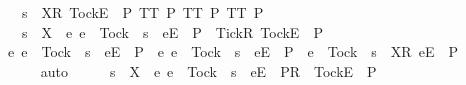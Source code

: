 \begin{isabellebody}
\ \ \ {\isachardoublequoteopen}s\ {\isacharat}\ {\isacharbrackleft}{\isacharbrackleft}X{\isacharbrackright}\isactrlsub R{\isacharcomma}\ {\isacharbrackleft}Tock{\isacharbrackright}\isactrlsub E{\isacharbrackright}\ {\isasymin}\ P{\isachardoublequoteclose}\ {\isachardoublequoteopen}TT{}\ P{\isachardoublequoteclose}\ {\isachardoublequoteopen}TT{}\ P{\isachardoublequoteclose}\ {\isachardoublequoteopen}TT{}\ P{\isachardoublequoteclose}\isanewline
\ \ \ {\isachardoublequoteopen}s\ {\isacharat}\ {\isacharbrackleft}{\isacharbrackleft}X\ {\isasymunion}\ {\isacharbraceleft}e{\isachardot}\ e\ {\isasymnoteq}\ Tock\ {\isasymand}\ s\ {\isacharat}\ {\isacharbrackleft}{\isacharbrackleft}e{\isacharbrackright}\isactrlsub E{\isacharbrackright}\ {\isasymnotin}\ P{\isacharbraceright}\ {\isasymunion}\ {\isacharbraceleft}Tick{\isacharbraceright}{\isacharbrackright}\isactrlsub R{\isacharcomma}\ {\isacharbrackleft}Tock{\isacharbrackright}\isactrlsub E{\isacharbrackright}\ {\isasymin}\ P{\isachardoublequoteclose}\isanewline
%
\isadelimproof
%
\endisadelimproof
%
\isatagproof
{}\isamarkupfalse%
\ {\isacharminus}\isanewline
\ \ \isamarkupfalse%
\ {\isachardoublequoteopen}{\isacharbraceleft}e{\isachardot}\ e\ {\isasymnoteq}\ Tock\ {\isasymand}\ s\ {\isacharat}\ {\isacharbrackleft}{\isacharbrackleft}e{\isacharbrackright}\isactrlsub E{\isacharbrackright}\ {\isasymnotin}\ P{\isacharbraceright}\ {\isasyminter}\ {\isacharbraceleft}e{\isachardot}\ {\isacharparenleft}e\ {\isasymnoteq}\ Tock\ {\isasymand}\ s\ {\isacharat}\ {\isacharbrackleft}{\isacharbrackleft}e{\isacharbrackright}\isactrlsub E{\isacharbrackright}\ {\isasymin}\ P{\isacharparenright}\ {\isasymor}\ {\isacharparenleft}e\ {\isacharequal}\ Tock\ {\isasymand}\ s\ {\isacharat}\ {\isacharbrackleft}{\isacharbrackleft}X{\isacharbrackright}\isactrlsub R{\isacharcomma}\ {\isacharbrackleft}e{\isacharbrackright}\isactrlsub E{\isacharbrackright}\ {\isasymin}\ P{\isacharparenright}\ {\isacharbraceright}\ {\isacharequal}\ {\isacharbraceleft}{\isacharbraceright}{\isachardoublequoteclose}\isanewline
\ \ \ \ \isamarkupfalse%
\ auto\isanewline
\ \ \isamarkupfalse%
\ \isamarkupfalse%
\ {\isachardoublequoteopen}s\ {\isacharat}\ {\isacharbrackleft}{\isacharbrackleft}X\ {\isasymunion}\ {\isacharbraceleft}e{\isachardot}\ e\ {\isasymnoteq}\ Tock\ {\isasymand}\ s\ {\isacharat}\ {\isacharbrackleft}{\isacharbrackleft}e{\isacharbrackright}\isactrlsub E{\isacharbrackright}\ {\isasymnotin}\ P{\isacharbraceright}{\isacharbrackright}\isactrlsub R{\isacharbrackright}\ {\isacharat}\ {\isacharbrackleft}{\isacharbrackleft}Tock{\isacharbrackright}\isactrlsub E{\isacharbrackright}\ {\isasymin}\ P{\isachardoublequoteclose}\isanewline

\end{isabellebody}
